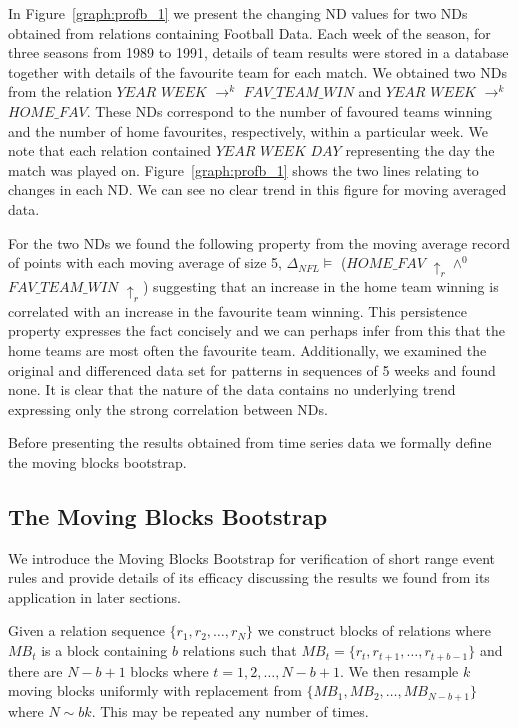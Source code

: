 In Figure~\ref{graph:profb_1} we present the changing ND values for
two NDs obtained from relations containing Football Data. Each week of
the season, for three seasons from 1989 to 1991, details of team
results were stored in a database together with details of the
favourite team for each match. We obtained two NDs from the relation
$YEAR$  $WEEK$ $\to^k$ $FAV\_TEAM\_WIN$ and $YEAR$  $WEEK$ $\to^k$
$HOME\_FAV$. These NDs correspond to the number of favoured teams
winning and the number of home favourites, respectively, within a
particular week.
We note that each relation contained $YEAR$  $WEEK$
 $DAY$ representing the day the match was played
on. Figure~\ref{graph:profb_1} shows
the two lines relating to changes in each ND. We can see no clear
trend in this figure for moving averaged data.

\medskip

For the two NDs we found the following property from the moving
average record of points with each moving average of size 5,
$\Delta_{NFL} \models$  ($HOME\_FAV$ $\uparrow_r \wedge^0$
$FAV\_TEAM\_WIN$ $\uparrow_r$) suggesting that an
increase in the home team winning is correlated with an increase in
the favourite team winning. This persistence property expresses the fact
concisely and we can perhaps infer from this that the home teams are
most often the favourite team. Additionally, we examined the original
and differenced data set for patterns in sequences of 5 weeks and
found none. It is 
clear that the nature of the data contains no underlying trend 
expressing only the strong correlation between NDs.

\medskip

Before presenting the results obtained from time series data we
formally define the moving blocks bootstrap.

\subsection{The Moving Blocks Bootstrap}\label{subsec:tr_mbb}


We introduce the Moving Blocks Bootstrap for verification of short
range event rules and provide details of its efficacy discussing the
results we found from its application in later sections.

\begin{definition}\label{def:mbb}
\begin{rm}
Given a relation sequence $\{ r_1, r_2, \ldots, r_N \}$
we construct blocks of relations where $MB_t$ is a block containing
$b$ relations such that $MB_t = \{ r_t, r_{t+1}, \ldots, r_{t+b-1} \}$
and there are $N - b+ 1$ blocks where $t = 1, 2, \ldots, N-b+1$. We
then resample $k$ moving blocks uniformly with replacement from $\{
MB_1, MB_2, \ldots, MB_{N-b+1} \}$ where $N \sim bk$. This may be repeated any number of times.
\end{rm}
\end{definition}

